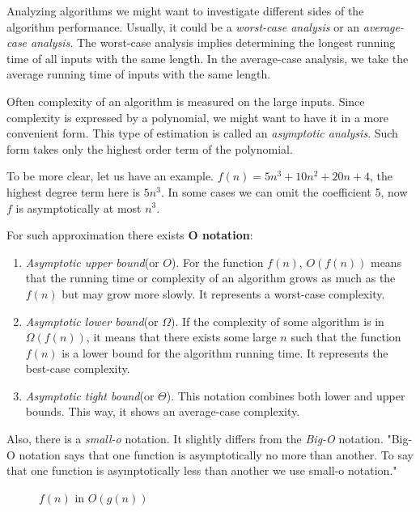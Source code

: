 \documentclass[
  field=inf,
  biblatex,
  language=english,
  glossaries,
  index
]{kidiplom}
\begin{document}
Analyzing algorithms we might want to investigate different sides of the algorithm performance. Usually, it could be a \textit{worst-case analysis} or an \textit{average-case analysis}. The worst-case analysis implies determining the longest running time of all inputs with the same length. In the average-case analysis, we take the average running time of inputs with the same length.

Often complexity of an algorithm is measured on the large inputs. Since complexity is expressed by a polynomial, we might want to have it in a more convenient form. This type of estimation is called an \textit{asymptotic analysis}. Such form takes only the highest order term of the polynomial.

To be more clear, let us have an example. $f(n) = 5n^3 + 10n^2 + 20n + 4$, the highest degree term here is $5n^3$. In some cases we can omit the coefficient 5, now $f$ is asymptotically at most $n^3$.

For such approximation there exists \textbf{O notation}:

\begin{enumerate}
	\item \textit{Asymptotic upper bound}(or $O$). For the function $f(n)$, $O(f(n))$ means that the running time or complexity of an algorithm grows as much as the $f(n)$ but may grow more slowly. It represents a worst-case complexity.
	\item \textit{Asymptotic lower bound}(or $\Omega$). If the complexity of some algorithm is in $\Omega(f(n))$, it means that there exists some large $n$ such that the function $f(n)$ is a lower bound for the algorithm running time. It represents the best-case complexity.
	\item \textit{Asymptotic tight bound}(or $\Theta$). This notation combines both lower and upper bounds. This way, it shows an average-case complexity.
\end{enumerate}

Also, there is a \textit{small-o} notation. It slightly differs from the \textit{Big-O} notation. "Big-O notation says that one function is asymptotically no more than  another. To say that one  function is asymptotically less than another we use small-o notation."\cite{sipser}

\begin{figure}[H]
	\begin{center}
		\caption{$f(n)$ in $O(g(n))$} \label{fig:big-omega}
	\end{center}
\end{figure}
\end{document}
